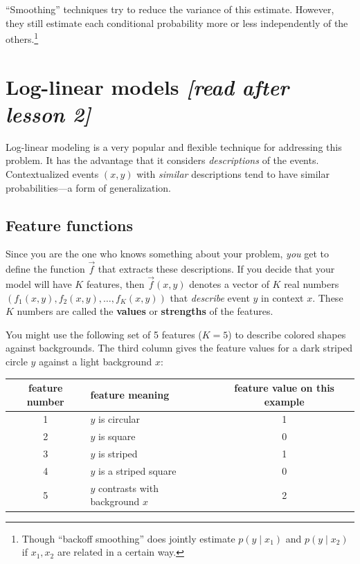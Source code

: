 \documentclass[11pt]{article}
\newcommand{\ph}{\hat{p}}
\begin{document}
\noindent
``Smoothing'' techniques try to reduce the variance of this estimate.
However, they still estimate each conditional probability more or less
independently of the others.\footnote{Though ``backoff smoothing'' does jointly
  estimate $p(y \mid x_1)$ and $p(y \mid x_2)$ if $x_1, x_2$ are
  related in a certain way.}

\section{Log-linear models {\em [read after lesson 2]}}

Log-linear modeling is a very popular and flexible technique for
addressing this problem.  It has the advantage that it considers {\em
  descriptions} of the events.  Contextualized events $(x,y)$ with
{\em similar} descriptions tend to have similar probabilities---a form
of generalization.

\subsection{Feature functions}\label{sec:featfuncs}

Since you are the one who knows something about your problem, {\em
  you} get to define the function $\vec{f}$ that extracts these
descriptions.  If you decide that your model will have $K$ features,
then $\vec{f}(x,y)$ denotes a vector of $K$ real numbers $(f_1(x,y),
f_2(x,y), \ldots, f_K(x,y))$ that {\em describe} event $y$ in context
$x$.  These $K$ numbers are called the {\bf values} or {\bf strengths}
of the features.

\medskip

You might use the following set of 5 features ($K=5$) to describe
colored shapes against backgrounds.  The third column gives the
feature values for a dark striped circle $y$ against a light
background $x$:

\smallskip
\begin{tabular}{|c|l|c|} \hline
feature number & feature meaning   & feature value on this example \\ \hline
1              & $y$ is circular   &    1 \\
2              & $y$ is square     &    0 \\
3              & $y$ is striped    &    1 \\
4              & $y$ is a striped square & 0 \\
5              & $y$ contrasts with background $x$ & 2 \\ \hline
\end{tabular}
\smallskip
\end{document}
